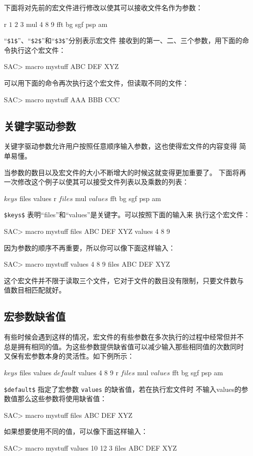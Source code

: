 下面将对先前的宏文件进行修改以使其可以接收文件名作为参数：
\begin{SACCode}
r $1$ $2$ $3$
mul 4 8 9
fft
bg sgf
psp am
\end{SACCode}
``\verb|$1$|''、``\verb|$2$|''和``\verb|$3$|''分别表示宏文件
接收到的第一、二、三个参数，用下面的命令执行这个宏文件：
\begin{SACCode}
SAC> macro mystuff ABC DEF XYZ
\end{SACCode}

可以用下面的命令再次执行这个宏文件，但读取不同的文件：
\begin{SACCode}
SAC> macro mystuff AAA BBB CCC
\end{SACCode}

\subsection{关键字驱动参数}
关键字驱动参数允许用户按照任意顺序输入参数，这也使得宏文件的内容变得
简单易懂。

当参数的数目以及宏文件的大小不断增大的时候这就变得更加重要了。
下面将再一次修改这个例子以使其可以接受文件列表以及乘数的列表：
\begin{SACCode}
$keys$ files values
r $files$
mul $values$
fft
bg sgf
psp am
\end{SACCode}
\verb|$keys$| 表明``files''和``values''是关键字。可以按照下面的输入来
执行这个宏文件：
\begin{SACCode}
SAC> macro mystuff files ABC DEF XYZ values 4 8 9
\end{SACCode}
因为参数的顺序不再重要，所以你可以像下面这样输入：
\begin{SACCode}
SAC> macro mystuff values 4 8 9 files ABC DEF XYZ
\end{SACCode}
这个宏文件并不限于读取三个文件，它对于文件的数目没有限制，只要文件数与
值数目相匹配就好。

\subsection{宏参数缺省值}
有些时候会遇到这样的情况，宏文件的有些参数在多次执行的过程中经常但并不
总是拥有相同的值。为这些参数提供缺省值可以减少输入那些相同值的次数同时
又保有宏参数本身的灵活性。如下例所示：
\begin{SACCode}
$keys$ files values
$default$ values 4 8 9
r $files$
mul $values$
fft
bg sgf
psp am
\end{SACCode}
\verb|$default$| 指定了宏参数 \texttt{values} 的缺省值，若在执行宏文件时
不输入values的参数值那么这些参数将使用缺省值：
\begin{SACCode}
SAC> macro mystuff files ABC DEF XYZ
\end{SACCode}
如果想要使用不同的值，可以像下面这样输入：
\begin{SACCode}
SAC> macro mystuff values 10 12 3 files ABC DEF XYZ
\end{SACCode}

